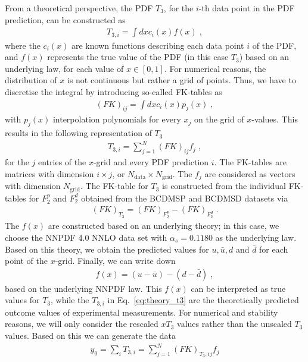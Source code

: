 \documentclass[11pt,a4paper]{article}
\begin{document}
From a theoretical perspective, the PDF $T_3$, for the $i$-th data point in the PDF prediction, can be constructed as 
%
\begin{align}
    T_{3,i} = \int dx c_i(x)f(x) \; ,
    \label{eq:theory_t3}
\end{align}
%
where the $c_i(x)$ are known functions describing each data point $i$ of the PDF, and $f(x)$ represents the true value of the PDF (in this case $T_3$) based on an underlying law, for each value of $x\in [0,1]$.
For numerical reasons, the distribution of $x$ is not continuous but rather a grid of points.
Thus, we have to discretise the integral by introducing so-called FK-tables as
%
\begin{align}
    (FK)_{ij} = \int dx c_i(x) p_j(x) \; ,
\end{align}
%
with $p_j(x)$ interpolation polynomials for every $x_j$ on the grid of $x$-values.
This results in the following representation of $T_3$
%
\begin{align}
    T_{3,i} = \sum_{j=1}^N (FK)_{ij}f_{j} \; ,
\end{align}
%
for the $j$ entries of the $x$-grid and every PDF prediction $i$. The FK-tables are matrices with dimension $i \times j$, or $N_\mathrm{data} \times N_\mathrm{grid}$. The $f_j$ are considered as vectors with dimension $N_\mathrm{grid}$.
The FK-table for $T_3$ is constructed from the individual FK-tables for $F_2^p$ and $F_2^d$ obtained from the BCDMSP and BCDMSD datasets via
\begin{align}
    (FK)_{T_3} = (FK)_{F_2^p} - (FK)_{F_2^d} \; .
\end{align}
%
The $f(x)$ are constructed based on an underlying theory; in this case, we choose the NNPDF 4.0 NNLO data set with $\alpha_s = 0.1180$ as the underlying law. Based on this theory, we obtain the predicted values for $u, \bar{u}, d$ and $\bar{d}$ for each point of the $x$-grid.
Finally, we can write down 
%
\begin{align}
    f(x) = (u - \bar{u}) - (d - \bar{d}) \; ,
\end{align}
%
based on the underlying NNPDF law. This $f(x)$ can be interpreted as true values for $T_3$, while the $T_{3,i}$ in Eq.~\eqref{eq:theory_t3} are the theoretically predicted outcome values of experimental measurements.
For numerical and stability reasons, we will only consider the rescaled $xT_3$ values rather than the unscaled $T_3$ values.
Based on this we can generate the data
%
\begin{align}
    y_0 = \sum_i T_{3,i} = \sum_{j=1}^N (FK)_{T_3, ij} f_{j}
\end{align}
\end{document}
